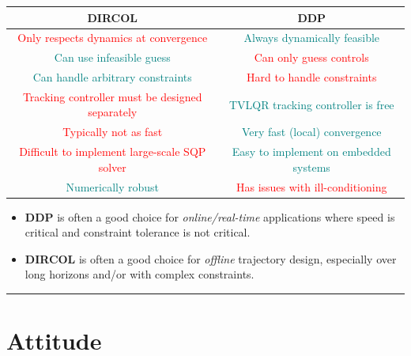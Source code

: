 \documentclass[11pt]{article}
\begin{document}
\begin{table}[h]
    \centering
    \renewcommand{\arraystretch}{1.5}
    \begin{tabular}{c|c}
        \textbf{DIRCOL} & \textbf{DDP} \\
        \hline
        \textcolor{red}{Only respects dynamics at convergence} & \textcolor{teal}{Always dynamically feasible} \\
        \textcolor{teal}{Can use infeasible guess} & \textcolor{red}{Can only guess controls} \\
        \textcolor{teal}{Can handle arbitrary constraints} & \textcolor{red}{Hard to handle constraints} \\
        \textcolor{red}{Tracking controller must be designed separately} & \textcolor{teal}{TVLQR tracking controller is free} \\
        \textcolor{red}{Typically not as fast} & \textcolor{teal}{Very fast (local) convergence} \\
        \textcolor{red}{Difficult to implement large-scale SQP solver} & \textcolor{teal}{Easy to implement on embedded systems} \\
        \textcolor{teal}{Numerically robust} & \textcolor{red}{Has issues with ill-conditioning} \\
    \end{tabular}
\end{table}

\begin{itemize}
    \item \textbf{DDP} is often a good choice for \textit{online/real-time} applications where speed is critical and constraint tolerance is not critical.
    \item \textbf{DIRCOL} is often a good choice for \textit{offline} trajectory design, especially over long horizons and/or with complex constraints.
\end{itemize}

\noindent\rule{\textwidth}{0.4pt} %
\section*{Attitude}
\end{document}

